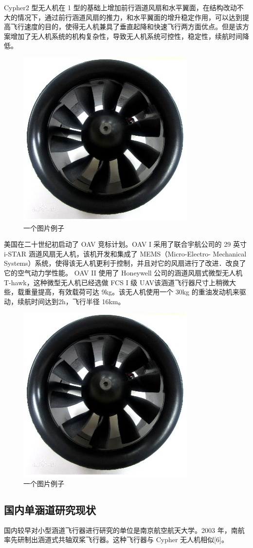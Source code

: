 \begin{ubox}
Cypher2 型无人机在 1 型的基础上增加前行涵道风扇和水平翼面，在结构改动不大的情况下，通过前行涵道风扇的推力，和水平翼面的增升稳定作用，可以达到提高飞行速度的目的，使得无人机兼具了垂直起降和快速飞行两方面优点。但是该方案增加了无人机系统的机构复杂性，导致无人机系统可控性，稳定性，续航时间降低。
\begin{figure}[H]
	\centering
	\includegraphics[width=0.4\linewidth]{p1.jpg}
	\caption{一个图片例子}
	\label{fig:main}
\end{figure}
美国在二十世纪初启动了 OAV 竞标计划。OAV  I 采用了联合宇航公司的 29 英寸 i-STAR 涵道风扇无人机，该机开发和集成了 MEMS（Micro-Electro- Mechanical Systems）系统，使得该无人机更利于控制，并且对它的风扇进行了改进．改良了它的空气动力学性能。
OAV II 使用了 Honeywell 公司的涵道风扇式微型无人机 T-hawk，这种微型无人机已经选做 FCS  I 级 UAV该涵道飞行器尺寸上稍微大些，载重量提高，有效载荷可达 9kg。该无人机使用一个 30kg 的重油发动机来驱动，续航时间达到2h，飞行半径 16km。
\begin{figure}[H]
	\centering
	\includegraphics[width=0.4\linewidth]{p1.jpg}
	\caption{一个图片例子}
	\label{fig:main}
\end{figure}

\subsection{国内单涵道研究现状}
\begin{table}[H]
	\centering
	\small
	\caption{数值}
\end{table}
国内较早对小型涵道飞行器进行研究的单位是南京航空航天大学。2003 年，南航率先研制出涵道式共轴双桨飞行器。这种飞行器与 Cypher 无人机相似[6]。


\end{ubox}
